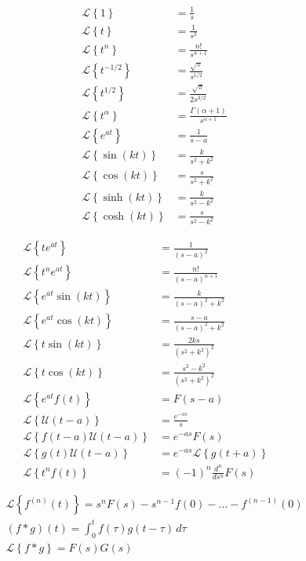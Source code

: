 
\newcommand{\LL}[1]{\mathcal{L}\left\{#1\right\}}

\begin{minipage}[t]{0.5\textwidth}
\begin{align*}
\LL{1} &= \frac{1}{s} \\
\LL{t} &= \frac{1}{s^2} \\
\LL{t^n} &= \frac{n!}{s^{n+1}} \\
\LL{t^{-1/2}} &= \frac{\sqrt{\pi}}{s^{1/2}} \\
\LL{t^{1/2}} &= \frac{\sqrt{\pi}}{2s^{3/2}} \\
\LL{t^\alpha} &= \frac{\Gamma(\alpha+1)}{s^{\alpha+1}} \\
\LL{e^{at}} &= \frac{1}{s-a} \\
\LL{\sin(kt)} &= \frac{k}{s^2+k^2} \\
\LL{\cos(kt)} &= \frac{s}{s^2+k^2} \\
\LL{\sinh(kt)} &= \frac{k}{s^2-k^2} \\
\LL{\cosh(kt)} &= \frac{s}{s^2-k^2}
\end{align*}
\end{minipage}
\begin{minipage}[t]{0.5\textwidth}
\begin{align*}
\LL{te^{at}} &= \frac{1}{(s-a)^2} \\
\LL{t^n e^{at}} &= \frac{n!}{(s-a)^{n+1}} \\
\LL{e^{at}\sin(kt)} &= \frac{k}{(s-a)^2+k^2} \\
\LL{e^{at}\cos(kt)} &= \frac{s-a}{(s-a)^2+k^2} \\
\LL{t\sin(kt)} &= \frac{2ks}{(s^2+k^2)^2} \\
\LL{t\cos(kt)} &= \frac{s^2-k^2}{(s^2+k^2)^2} \\
\LL{e^{at}f(t)} &= F(s-a) && \\
\LL{\mathcal{U}(t-a)} &= \frac{e^{-as}}{s} \\
\LL{f(t-a) \mathcal{U}(t-a)} &= e^{-as} F(s) \\
\LL{g(t) \mathcal{U}(t-a)} &= e^{-as} \LL{g(t+a)} \\
\LL{t^n f(t)} &= (-1)^n \frac{d^n}{ds^n}F(s)
\end{align*}
\end{minipage}

\medskip
\begin{center}
\begin{minipage}[t]{0.7\textwidth}
\begin{gather*}
\LL{f^{(n)}(t)} = s^n F(s) - s^{n-1} f(0) - \dots - f^{(n-1)}(0) \\
(f\ast g)(t) = \int_0^t f(\tau)g(t-\tau)\,d\tau \\
\LL{f\ast g} = F(s) G(s)
\end{gather*}
\end{minipage}
\end{center}
